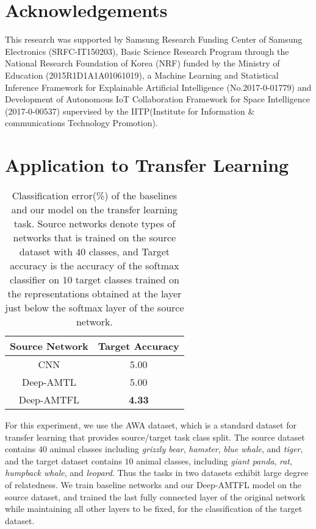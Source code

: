 \documentclass{article}
\begin{document}
	\section*{Acknowledgements} This research was supported by Samsung Research Funding Center of
Samsung Electronics (SRFC-IT150203), Basic Science Research Program through the National Research Foundation of Korea (NRF) funded by the Ministry of Education (2015R1D1A1A01061019), a Machine Learning and Statistical Inference Framework for Explainable Artificial Intelligence (No.2017-0-01779) and Development of Autonomous IoT Collaboration Framework for Space Intelligence (2017-0-00537) supervised by the IITP(Institute for Information \& communications Technology Promotion).
	
		
		
		\appendix
		
		\section{Application to Transfer Learning}	
		\vspace{-0.15in}
		\begin{table}[h]
			\small
			\caption{\small Classification error(\%) of the baselines and our model on the transfer learning task. Source networks denote types of networks that is trained on the source dataset with $40$ classes, and Target accuracy is the accuracy of the softmax classifier on $10$ target classes trained on the representations obtained at the layer just below the softmax layer of the source network.}
			\label{awa_transfer}
			\begin{center}
				\begin{tabular}{c c}
					Source Network & Target Accuracy\\
					\hline
					\hline
					CNN & 5.00 \\
					Deep-AMTL & 5.00 \\
					\hline
					Deep-AMTFL & \bf 4.33 \\
				\end{tabular}
			\end{center}
			\vspace{-0.15in}
		\end{table}
		
		For this experiment, we use the AWA dataset, which is a standard dataset for transfer learning that provides source/target task class split. The source dataset contains $40$ animal classes including \emph{grizzly bear}, \emph{hamster}, \emph{blue whale}, and \emph{tiger}, and the target dataset contains $10$ animal classes, including \emph{giant panda}, \emph{rat}, \emph{humpback whale}, and \emph{leopard}. Thus the tasks in two datasets exhibit large degree of relatedness. We train baseline networks and our Deep-AMTFL model on the source dataset, and trained the last fully connected layer of the original network while maintaining all other layers to be fixed, for the classification of the target dataset. 
		
\end{document}
